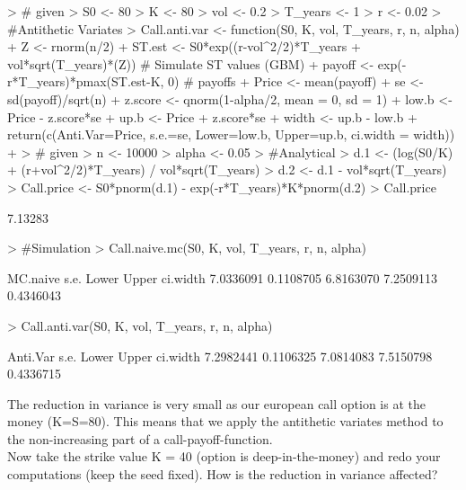 \documentclass{article}
\begin{document}
\begin{Schunk}
\begin{Sinput}
> # given
> S0 <- 80
> K <- 80
> vol <- 0.2
> T_years <- 1
> r <- 0.02
> #Antithetic Variates
> Call.anti.var <- function(S0, K, vol, T_years, r, n, alpha){
+   Z <- rnorm(n/2)
+   ST.est <- S0*exp((r-vol^2/2)*T_years + vol*sqrt(T_years)*(Z)) # Simulate ST values (GBM)
+   payoff <- exp(-r*T_years)*pmax(ST.est-K, 0) # payoffs
+   Price <- mean(payoff) 
+   se <- sd(payoff)/sqrt(n)
+   z.score <- qnorm(1-alpha/2, mean = 0, sd = 1)
+   low.b <- Price - z.score*se
+   up.b <- Price + z.score*se
+   width <- up.b - low.b
+   return(c(Anti.Var=Price, s.e.=se, Lower=low.b, Upper=up.b, ci.width = width))
+ }
> # given
> n <- 10000
> alpha <- 0.05
> #Analytical
> d.1 <- (log(S0/K) + (r+vol^2/2)*T_years) / vol*sqrt(T_years)
> d.2 <- d.1 - vol*sqrt(T_years)
> Call.price <- S0*pnorm(d.1) - exp(-r*T_years)*K*pnorm(d.2)
> Call.price
\end{Sinput}
\begin{Soutput}
[1] 7.13283
\end{Soutput}
\begin{Sinput}
> #Simulation
> Call.naive.mc(S0, K, vol, T_years, r, n, alpha)
\end{Sinput}
\begin{Soutput}
 MC.naive      s.e.     Lower     Upper  ci.width 
7.0336091 0.1108705 6.8163070 7.2509113 0.4346043 
\end{Soutput}
\begin{Sinput}
> Call.anti.var(S0, K, vol, T_years, r, n, alpha)
\end{Sinput}
\begin{Soutput}
 Anti.Var      s.e.     Lower     Upper  ci.width 
7.2982441 0.1106325 7.0814083 7.5150798 0.4336715 
\end{Soutput}
\end{Schunk}

The reduction in variance is very small as our european call option is at the money (K=S=80). This means that we apply the antithetic variates method to the non-increasing part of a call-payoff-function.\\

Now take the strike value K = 40 (option is deep-in-the-money) and redo your computations (keep the seed fixed).
How is the reduction in variance affected?
\end{document}

